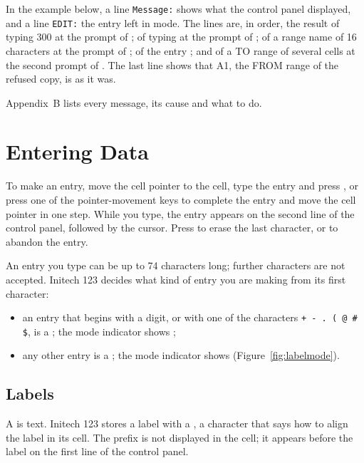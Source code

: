 In the example below, a line \texttt{Message:} shows what the control panel
displayed, and a line \texttt{EDIT:} the entry left in  mode.
The lines are, in order, the result of typing 300 at the prompt of
; of typing  at the prompt
of ; of a range name of 16 characters at the prompt of
; of the entry ; and of a TO range
of several cells at the second prompt of .  The last line
shows that A1, the FROM range of the refused copy, is as it was.


Appendix~B lists every message, its cause and what to do.

\section{Entering Data}
To make an entry, move the cell pointer to the cell, type the entry and
press , or press one of the pointer-movement keys to complete
the entry and move the cell pointer in one step.  While you type, the entry
appears on the second line of the control panel, followed by the cursor.
Press  to erase the last character, or  to
abandon the entry.

An entry you type can be up to 74 characters long; further characters are
not accepted.  Initech 123 decides what kind of entry you are making from
its first character:
\begin{itemize}
\item an entry that begins with a digit, or with one of the characters
  \texttt{+ - . ( @ \# \$}, is a ; the mode indicator shows
  ;
\item any other entry is a ; the mode indicator shows
   (Figure~\ref{fig:labelmode}).
\end{itemize}


\subsection{Labels}
A  is text.  Initech 123 stores a label with a
, a character that says how to align the label in its
cell.  The prefix is not displayed in the cell; it appears before the label
on the first line of the control panel.

